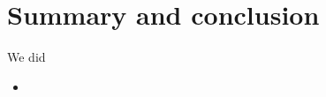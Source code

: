 \section{Summary and conclusion}\label{sec:sumconc}

We did 
\begin{itemize}
    \item 
\end{itemize}